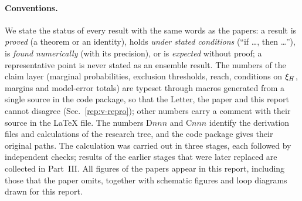 \paragraph{Conventions.}
We state the status of every result with the same words as the papers: a result is \emph{proved} (a theorem or an identity), holds \emph{under stated conditions} (``if \ldots, then \ldots''), is \emph{found numerically} (with its precision), or is \emph{expected} without proof; a representative point is never stated as an ensemble result.
The numbers of the claim layer (marginal probabilities, exclusion thresholds, reach, conditions on $\xi_H$, margins and model-error totals) are typeset through macros generated from a single source in the code package, so that the Letter, the paper and this report cannot disagree (Sec.~\ref{rep:v-repro}); other numbers carry a comment with their source in the LaTeX file.
The numbers D$nnn$ and C$nnn$ identify the derivation files and calculations of the research tree, and the code package gives their original paths.
The calculation was carried out in three stages, each followed by independent checks; results of the earlier stages that were later replaced are collected in Part~III.
All figures of the papers appear in this report, including those that the paper omits, together with schematic figures and loop diagrams drawn for this report.
